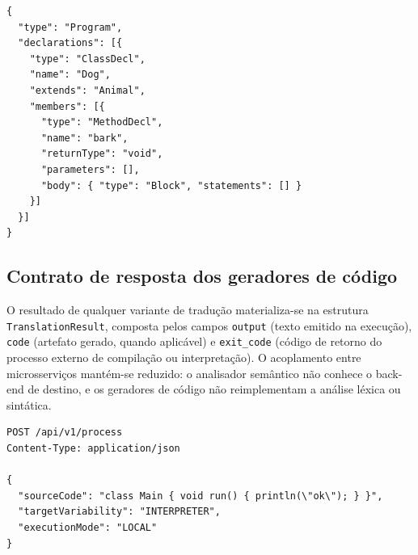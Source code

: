 \begin{lstlisting}[caption={Exemplo mínimo de documento JSON para uma classe com herança}]
{
  "type": "Program",
  "declarations": [{
    "type": "ClassDecl",
    "name": "Dog",
    "extends": "Animal",
    "members": [{
      "type": "MethodDecl",
      "name": "bark",
      "returnType": "void",
      "parameters": [],
      "body": { "type": "Block", "statements": [] }
    }]
  }]
}
\end{lstlisting}

\subsection{Contrato de resposta dos geradores de código}

O resultado de qualquer variante de tradução materializa-se na estrutura \texttt{TranslationResult}, composta pelos campos \texttt{output} (texto emitido na execução), \texttt{code} (artefato gerado, quando aplicável) e \texttt{exit\_code} (código de retorno do processo externo de compilação ou interpretação). O acoplamento entre microsserviços mantém-se reduzido: o analisador semântico não conhece o back-end de destino, e os geradores de código não reimplementam a análise léxica ou sintática.

\begin{lstlisting}[caption={Corpo típico de requisição ao gateway central}]
POST /api/v1/process
Content-Type: application/json

{
  "sourceCode": "class Main { void run() { println(\"ok\"); } }",
  "targetVariability": "INTERPRETER",
  "executionMode": "LOCAL"
}
\end{lstlisting}
